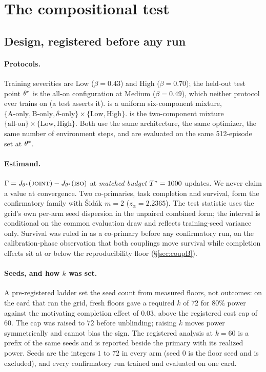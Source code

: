 \section{The compositional test}
\label{sec:test}

\subsection{Design, registered before any run}

\paragraph{Protocols.} Training severities are Low ($\beta = 0.43$) and High
($\beta = 0.70$); the held-out test point $\theta^{\ast}$ is the all-on
configuration at Medium ($\beta = 0.49$), which neither protocol ever trains
on (a test asserts it). \ISO{} is a uniform six-component mixture,
$\{\text{A-only}, \text{B-only}, \delta\text{-only}\} \times \{\text{Low},
\text{High}\}$. \JOINT{} is the two-component mixture $\{\text{all-on}\}
\times \{\text{Low}, \text{High}\}$. Both use the same architecture, the same
optimizer, the same number of environment steps, and are evaluated on the
same 512-episode set at $\theta^{\ast}$.

\paragraph{Estimand.} $\Gamma = J_{\theta^{\ast}}(\textsc{joint}) - J_{\theta^{\ast}}(\textsc{iso})$
at \emph{matched budget} $T^{\ast} = 1000$ updates. We never claim a value at
convergence. Two co-primaries, task completion and survival, form the
confirmatory family with \v{S}id\'ak $m = 2$ ($z_\alpha = 2.2365$). The test
statistic uses the grid's own per-arm seed dispersion in the unpaired
combined form; the interval is conditional on the common evaluation draw and
reflects training-seed variance only. Survival was ruled in as a co-primary
before any confirmatory run, on the calibration-phase observation that both
couplings move survival while completion effects sit at or below the
reproducibility floor (\S\ref{sec:coupB}).

\paragraph{Seeds, and how $k$ was set.} A pre-registered ladder set the seed
count from measured floors, not outcomes: on the card that ran the grid,
fresh floors gave a required $k$ of $72$ for 80\% power against the
motivating completion effect of $0.03$, above the registered cost cap of
$60$. The cap was raised to $72$ before unblinding; raising $k$ moves power
symmetrically and cannot bias the sign. The registered analysis at $k = 60$ is
a prefix of the same seeds and is reported beside the primary with its
realized power. Seeds are the integers $1$ to $72$ in every arm (seed $0$ is
the floor seed and is excluded), and every confirmatory run trained and
evaluated on one card.

